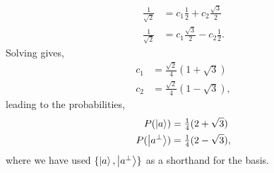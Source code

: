 \begin{enumerate}[label=\alph*.,ref={Sol.~\thesection\alph*}]
\begin{align*}
        \tfrac{1}{\sqrt{2}} &= c_1 \tfrac{1}{2} + c_2 \tfrac{\sqrt{3}}{2} \\
        \tfrac{1}{\sqrt{2}} &= c_1 \tfrac{\sqrt{3}}{2} - c_2 \tfrac{1}{2}.
    \end{align*}
    Solving gives,
    \begin{align*}
        c_1 &= \tfrac{\sqrt{2}}{4} (1 + \sqrt{3}) \\
        c_2 &= \tfrac{\sqrt{2}}{4} (1 - \sqrt{3}),
    \end{align*}
    leading to the probabilities,
    \begin{align*}
        P(\ket{a}) &= \tfrac{1}{4} (2 + \sqrt{3}) \\
        P(\ket{a^\perp}) &= \tfrac{1}{4} (2 - \sqrt{3}),
    \end{align*}
    where we have used $\{ \ket{a}, \ket{a^\perp} \}$ as a shorthand for the basis.
\end{enumerate}
